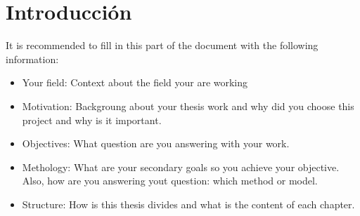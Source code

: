
\chapter*{Introducción}
\label{chapter:intro}


 It is recommended to fill in this part of the document with the following information:

\begin{itemize}
	\item Your field: Context about the field your are working
	\item Motivation: Backgroung about your thesis work and why did you choose this project and why is it important.
	\item Objectives: What question are you answering with your work.
	\item Methology: What are your secondary goals so you achieve your objective. Also, how are you answering yout question: which method or model.
	\item Structure: How is this thesis divides and what is the content of each chapter.
\end{itemize}

\Blindtext
